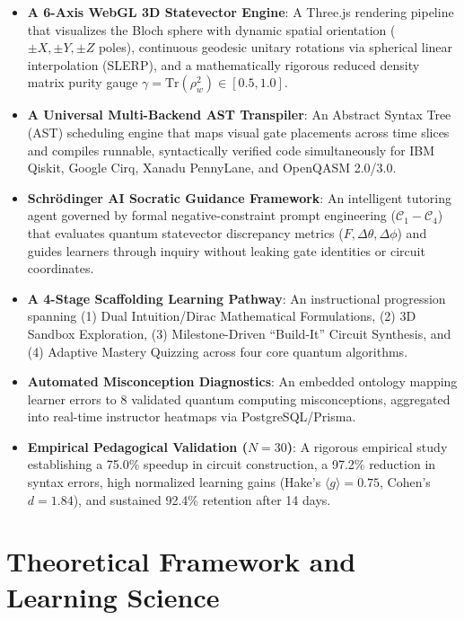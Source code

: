 \documentclass[conference]{IEEEtran}
\begin{document}
\begin{itemize}[leftmargin=*,itemsep=3pt]
    \item \textbf{A 6-Axis WebGL 3D Statevector Engine}: A Three.js rendering pipeline that visualizes the Bloch sphere with dynamic spatial orientation ($\pm X, \pm Y, \pm Z$ poles), continuous geodesic unitary rotations via spherical linear interpolation (SLERP), and a mathematically rigorous reduced density matrix purity gauge $\gamma = \text{Tr}(\rho_w^2) \in [0.5, 1.0]$.
    \item \textbf{A Universal Multi-Backend AST Transpiler}: An Abstract Syntax Tree (AST) scheduling engine that maps visual gate placements across time slices and compiles runnable, syntactically verified code simultaneously for IBM Qiskit, Google Cirq, Xanadu PennyLane, and OpenQASM 2.0/3.0.
    \item \textbf{Schr{\"o}dinger AI Socratic Guidance Framework}: An intelligent tutoring agent governed by formal negative-constraint prompt engineering ($\mathcal{C}_1-\mathcal{C}_4$) that evaluates quantum statevector discrepancy metrics ($F, \Delta\theta, \Delta\phi$) and guides learners through inquiry without leaking gate identities or circuit coordinates.
    \item \textbf{A 4-Stage Scaffolding Learning Pathway}: An instructional progression spanning (1) Dual Intuition/Dirac Mathematical Formulations, (2) 3D Sandbox Exploration, (3) Milestone-Driven ``Build-It'' Circuit Synthesis, and (4) Adaptive Mastery Quizzing across four core quantum algorithms.
    \item \textbf{Automated Misconception Diagnostics}: An embedded ontology mapping learner errors to 8 validated quantum computing misconceptions, aggregated into real-time instructor heatmaps via PostgreSQL/Prisma.
    \item \textbf{Empirical Pedagogical Validation ($N=30$)}: A rigorous empirical study establishing a 75.0\% speedup in circuit construction, a 97.2\% reduction in syntax errors, high normalized learning gains (Hake's $\langle g \rangle = 0.75$, Cohen's $d = 1.84$), and sustained 92.4\% retention after 14 days.
\end{itemize}

\section{Theoretical Framework and Learning Science}
\label{sec:theory}
\end{document}
